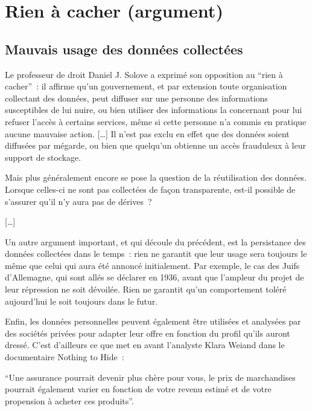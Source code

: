 \section{Rien à cacher (argument)}

\subsection{Mauvais usage des données collectées}

Le professeur de droit Daniel J. Solove a exprimé son opposition au \enquote{rien à cacher} : il affirme qu'un gouvernement, et par extension toute organisation collectant des données, peut diffuser sur une personne des informations susceptibles de lui nuire, ou bien utiliser des informations la concernant pour lui refuser l'accès à certains services, même si cette personne n'a commis en pratique aucune mauvaise action. […] Il n'est pas exclu en effet que des données soient diffusées par mégarde, ou bien que quelqu'un obtienne un accès frauduleux à leur support de stockage.

Mais plus généralement encore se pose la question de la réutilisation des données. Lorsque celles-ci ne sont pas collectées de façon transparente, est-il possible de s'assurer qu'il n'y aura pas de dérives ?

[…]

Un autre argument important, et qui découle du précédent, est la persistance des données collectées dans le temps : rien ne garantit que leur usage sera toujours le même que celui qui aura été annoncé initialement. Par exemple, le cas des Juifs d'Allemagne, qui sont allés se déclarer en 1936, avant que l'ampleur du projet de leur répression ne soit dévoilée. Rien ne garantit qu'un comportement toléré aujourd'hui le soit toujours dans le futur.

Enfin, les données personnelles peuvent également être utilisées et analysées par des sociétés privées pour adapter leur offre en fonction du profil qu'ils auront dressé. C'est d'ailleurs ce que met en avant l'analyste Klara Weiand dans le documentaire Nothing to Hide :

\enquote{Une assurance pourrait devenir plus chère pour vous, le prix de marchandises pourrait également varier en fonction de votre revenu estimé et de votre propension à acheter ces produits}.
